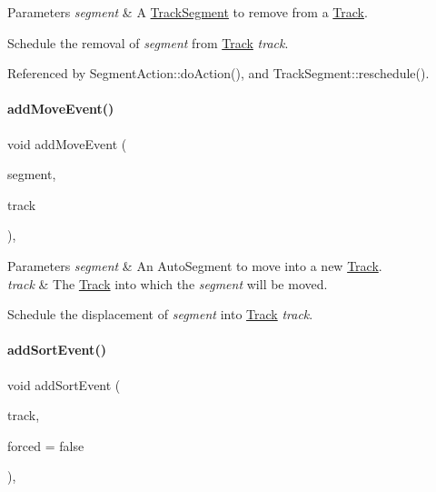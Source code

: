 \begin{DoxyParams}{Parameters}
{\em segment} & A \mbox{\hyperlink{classKite_1_1TrackSegment}{Track\+Segment}} to remove from a \mbox{\hyperlink{classKite_1_1Track}{Track}}.\\
\hline
\end{DoxyParams}
Schedule the removal of {\itshape segment} from \mbox{\hyperlink{classKite_1_1Track}{Track}} {\itshape track}. 

Referenced by Segment\+Action\+::do\+Action(), and Track\+Segment\+::reschedule().

\mbox{\label{classKite_1_1Session_aa42e4cb9e2559c00d68821f535ef7838}} 
\paragraph{\texorpdfstring{add\+Move\+Event()}{addMoveEvent()}}
{\footnotesize\ttfamily void add\+Move\+Event (\begin{DoxyParamCaption}\item[{\mbox{\hyperlink{classKite_1_1TrackElement}{Track\+Element}} $\ast$}]{segment,  }\item[{\mbox{\hyperlink{classKite_1_1Track}{Track}} $\ast$}]{track }\end{DoxyParamCaption})\hspace{0.3cm}{\ttfamily [inline]}, {\ttfamily [static]}}


\begin{DoxyParams}{Parameters}
{\em segment} & An Auto\+Segment to move into a new \mbox{\hyperlink{classKite_1_1Track}{Track}}. \\
\hline
{\em track} & The \mbox{\hyperlink{classKite_1_1Track}{Track}} into which the {\itshape segment} will be moved.\\
\hline
\end{DoxyParams}
Schedule the displacement of {\itshape segment} into \mbox{\hyperlink{classKite_1_1Track}{Track}} {\itshape track}. \mbox{\label{classKite_1_1Session_a990d32b1f1ea661b088a05f86319772f}} 
\paragraph{\texorpdfstring{add\+Sort\+Event()}{addSortEvent()}}
{\footnotesize\ttfamily void add\+Sort\+Event (\begin{DoxyParamCaption}\item[{\mbox{\hyperlink{classKite_1_1Track}{Track}} $\ast$}]{track,  }\item[{bool}]{forced = {\ttfamily false} }\end{DoxyParamCaption})\hspace{0.3cm}{\ttfamily [inline]}, {\ttfamily [static]}}


